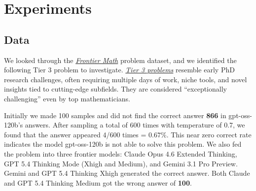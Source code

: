 \documentclass{article}
\begin{document}
\section{Experiments}

\subsection{Data}
We looked through the \textit{\href{https://epoch.ai/frontiermath/tiers-1-4/benchmark-problems}{Frontier Math}} problem dataset, and we identified the following Tier 3 problem to investigate. \textit{\href{https://epoch.ai/frontiermath/tiers-1-4/benchmark-problems\#tier-3}{Tier 3 problems}} resemble early PhD research challenges, often requiring multiple days of work, niche tools, and novel insights tied to cutting-edge subfields. They are considered “exceptionally challenging” even by top mathematicians.


\begin{center}
\setlength{\fboxsep}{10pt}
\end{center}


Initially we made 100 samples and did not find the correct answer \textbf{866} in gpt-oss-120b's answers. After sampling a total of 600 times with temperature of 0.7, we found that the answer appeared 4/600 times = $0.67\%$. This near zero correct rate indicates the model gpt-oss-120b is not able to solve this problem. We also fed the problem into three frontier models: Claude Opus 4.6 Extended Thinking, GPT 5.4 Thinking Mode (Xhigh and Medium), and Gemini 3.1 Pro Preview. Gemini and GPT 5.4 Thinking Xhigh generated the correct answer. Both Claude and GPT 5.4 Thinking Medium got the wrong answer of \textbf{100}. 
\end{document}
